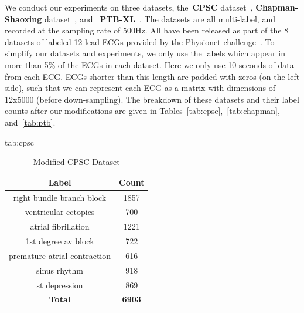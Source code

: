 \documentclass[pmlr,twocolumn]{jmlr}%
\begin{document}
We conduct our experiments on three datasets, the~\textbf{CPSC} dataset~\cite{liu2018open}, \textbf{Chapman-Shaoxing} dataset~\cite{zheng202012}, and ~\textbf{PTB-XL}~\cite{wagner2020ptb}. The datasets are all multi-label, and recorded at the sampling rate of 500Hz. All have been released as part of the 8 datasets of labeled 12-lead ECGs provided by the Physionet challenge~\cite{reyna2021will,reyna4issues}.
To simplify our datasets and experiments, we only use the labels which appear in more than 5\% of the ECGs in each dataset. Here we only use 10 seconds of data from each ECG. ECGs shorter than this length are padded with zeros (on the left side), such that we can represent each ECG as a matrix with dimensions of 12x5000 (before down-sampling).
The breakdown of these datasets and their label counts after our modifications are given in Tables~\ref{tab:cpsc},~\ref{tab:chapman}, and~\ref{tab:ptb}.
\begin{table}[tbp]
\floatconts
  {tab:cpsc}%
  {\caption{Modified CPSC Dataset}}%
  {
\begin{tabular}{|c|c|}
 \hline
Label & Count \\
 \hline
right bundle branch block    &  1857 \\
ventricular ectopics         &   700 \\
atrial fibrillation          &  1221 \\
1st degree av block          &   722 \\
premature atrial contraction &   616 \\
sinus rhythm                 &   918 \\
st depression                &   869 \\
 \hline
\textbf{Total} & \textbf{6903}\\
\hline
\end{tabular}
  }
\end{table}
\end{document}
